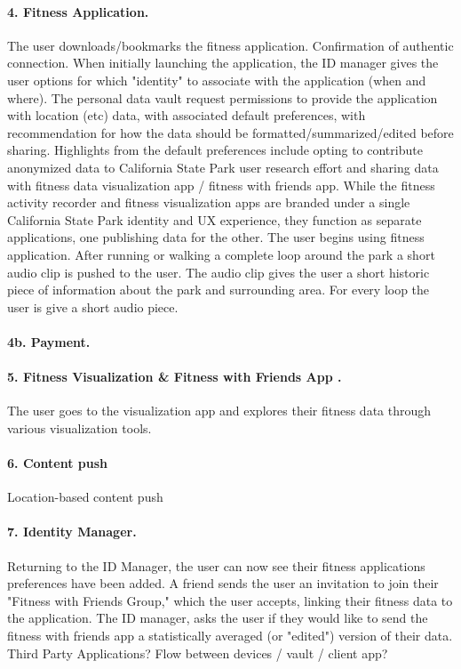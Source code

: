 \paragraph*{4. Fitness Application.}  
The user downloads/bookmarks the fitness application. Confirmation of authentic connection. 
When initially launching the application, the ID manager gives the user options for which "identity" to associate with the application (when and where). The personal data vault request permissions to provide the application with location (etc) data, with associated default preferences, with recommendation for how the data should be formatted/summarized/edited before sharing. Highlights from the default preferences include opting to contribute anonymized data to California State Park user research effort and sharing data with fitness data visualization app / fitness with friends app. While the fitness activity recorder and fitness visualization apps are branded under a single California State Park identity and UX experience, they function as separate applications, one publishing data for the other. The user begins using fitness application. After running or walking a complete loop around the park a short audio clip is pushed to the user. The audio clip gives the user a short historic piece of information about the park and surrounding area. For every loop the user is give a short audio piece. 

\paragraph*{4b. Payment.}

\paragraph*{5. Fitness Visualization \& Fitness with Friends App .}
The user goes to the visualization app and explores their fitness data through various visualization tools.      

\paragraph*{6. Content push} 

Location-based content push

\paragraph*{7. Identity Manager.} 
Returning to the ID Manager, the user can now see their fitness applications preferences have been added.  A friend sends the user an invitation to join their "Fitness with Friends Group," which the user accepts, linking their fitness data to the application. The ID manager, asks the user if they would like to send the fitness with friends app a statistically averaged (or "edited") version of their data.    
Third Party Applications? Flow between devices / vault / client app? 

